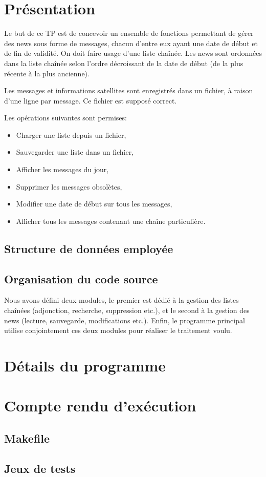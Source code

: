 \documentclass{report}
\begin{document}
  
  \setlength{\parskip}{10pt}
  \setlength{\parindent}{0pt}
  \chapter{Présentation}
    Le but de ce TP est de concevoir un ensemble de fonctions permettant de gérer des news sous forme de messages, chacun d'entre eux ayant une date de début et de fin de validité. On doit faire usage d'une liste chaînée. Les news sont ordonnées dans la liste chaînée selon l'ordre décroissant de la date de début (de la plus récente à la plus ancienne).

    Les messages et informations satellites sont enregistrés dans un fichier, à raison d'une ligne par message. Ce fichier est supposé correct.

    Les opérations suivantes sont permises:
    \begin{itemize}
      \item Charger une liste depuis un fichier,
      \item Sauvegarder une liste dans un fichier,
      \item Afficher les messages du jour,
      \item Supprimer les messages obsolètes,
      \item Modifier une date de début sur tous les messages,
      \item Afficher tous les messages contenant une chaîne particulière.
    \end{itemize}

    \section{Structure de données employée}
      
    \section{Organisation du code source}
      Nous avons défini deux modules, le premier est dédié à la gestion des listes chaînées (adjonction, recherche, suppression etc.), et le second à la gestion des news (lecture, sauvegarde, modifications etc.). Enfin, le programme principal utilise conjointement ces deux modules pour réaliser le traitement voulu.
      
  \chapter{Détails du programme}
    

  \chapter{Compte rendu d'exécution}
    \section{Makefile}

    \section{Jeux de tests}
\end{document}
